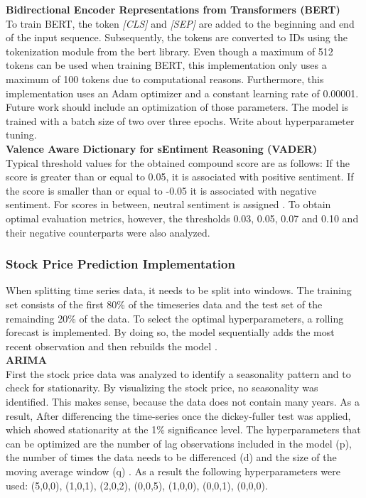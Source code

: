 \documentclass[11pt, a4paper]{article}
\begin{document}
\noindent\textbf{Bidirectional Encoder Representations from Transformers (BERT)}\\
To train BERT, the token \emph{[CLS]} and \emph{[SEP]} are added to the beginning and end of the input sequence. Subsequently, the tokens are converted to IDs using the tokenization
module from the bert library. Even though a maximum of 512 tokens can be used when training BERT, this implementation only uses a maximum of 100 tokens due to computational reasons.
Furthermore, this implementation uses an Adam optimizer and a constant learning rate of 0.00001. Future work should include an optimization of those parameters. The model is trained with
a batch size of two over three epochs. Write about hyperparameter tuning.\\

\noindent\textbf{Valence Aware Dictionary for sEntiment Reasoning (VADER)}\\
Typical threshold values for the obtained compound score are as follows: 
If the score is greater than or equal to 0.05, it is associated with positive sentiment. If the score is smaller than or equal to -0.05 it is associated with negative sentiment. For scores
in between, neutral sentiment is assigned \citep{hutto2015vader}. To obtain optimal evaluation metrics, however, the thresholds 0.03, 0.05, 0.07 and 0.10 and their negative counterparts were
also analyzed.

\subsubsection{Stock Price Prediction Implementation}
When splitting time series data, it needs to be split into windows. The training set consists of the first 80\% of the timeseries data and
the test set of the remainding 20\% of the data. To select the optimal hyperparameters, a rolling forecast is implemented. By doing so, the model 
sequentially adds the most recent observation and then rebuilds the model \citep{sima2018timeseries}.\\

\noindent\textbf{ARIMA}\\
First the stock price data was analyzed to identify a seasonality pattern and to check for stationarity.
By visualizing the stock price, no seasonality was identified. This makes sense, because the data does not contain many years.
As a result, 
After differencing the time-series once the dickey-fuller test was applied, which showed stationarity at the 1\% significance level.
The hyperparameters that can be optimized are the number of lag observations
included in the model (p), the number of times the data needs to be differenced (d) and the size of the moving average window (q) \citep{sima2018timeseries}. As a result the following
hyperparameters were used: (5,0,0), (1,0,1), (2,0,2), (0,0,5), (1,0,0), (0,0,1), (0,0,0). \\
\end{document}
